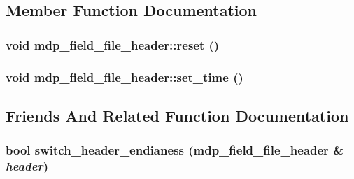 \subsection{Member Function Documentation}
\hypertarget{classmdp__field__file__header_a818d41240687af568d930b91ac687299}{
\subsubsection[{reset}]{\setlength{\rightskip}{0pt plus 5cm}void mdp\_\-field\_\-file\_\-header::reset ()}}
\label{classmdp__field__file__header_a818d41240687af568d930b91ac687299}
\hypertarget{classmdp__field__file__header_a6f944ea85e7d6176900139768098844a}{
\subsubsection[{set\_\-time}]{\setlength{\rightskip}{0pt plus 5cm}void mdp\_\-field\_\-file\_\-header::set\_\-time ()}}
\label{classmdp__field__file__header_a6f944ea85e7d6176900139768098844a}


\subsection{Friends And Related Function Documentation}
\hypertarget{classmdp__field__file__header_ab3818e6c0a7da0722f0157d14ef19e06}{
\subsubsection[{switch\_\-header\_\-endianess}]{\setlength{\rightskip}{0pt plus 5cm}bool switch\_\-header\_\-endianess ({\bf mdp\_\-field\_\-file\_\-header} \& {\em header})}}
\label{classmdp__field__file__header_ab3818e6c0a7da0722f0157d14ef19e06}


